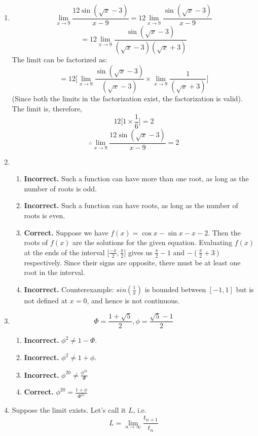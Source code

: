 \documentclass[a4paper,12pt]{article} %
\begin{document}
\begin{enumerate}
  \item \[\lim_{x\to 9} \frac{12 \sin(\sqrt{x} - 3)}{x - 9} = 12 \lim_{x\to 9} \frac{\sin(\sqrt{x} - 3)}{x - 9} \]
    $$ = 12 \lim_{x\to 9} \frac{\sin(\sqrt{x} - 3)}{(\sqrt{x} - 3)(\sqrt{x} + 3)}$$
    The limit can be factorized as:
    $$ = 12 \Big[\lim_{x\to 9} \frac{\sin(\sqrt{x} - 3)}{(\sqrt{x} - 3)} \times \lim_{x\to 9} \frac{1}{(\sqrt{x} + 3)} \Big]$$
    (Since both the limits in the factorization exist, the factorization is valid). The limit is, therefore,
    $$ 12 \Big[1 \times \frac{1}{6}\Big] = 2$$
    $$ \therefore \lim_{x\to 9} \frac{12 \sin(\sqrt{x} - 3)}{x - 9} = 2$$
  \item
    \begin{enumerate}
      \item \textbf{Incorrect.} Such a function can have more than one root, as long as the number of roots is odd.
      \item \textbf{Incorrect.} Such a function can have roots, as long as the number of roots is even.
      \item \textbf{Correct.} Suppose we have $f(x) = \cos{x} - \sin{x} - x - 2$. Then the roots of $f(x)$ are the solutions for the given equation. Evaluating $f(x)$ at the ends of the interval $\Big[\frac{-\pi}{2}, \frac{\pi}{2}\Big]$ gives us $\frac{\pi}{2} - 1$ and $-(\frac{\pi}{2} + 3)$ respectively. Since their signs are opposite, there must be at least one root in the interval.
      \item \textbf{Incorrect.} Counterexample: $sin(\frac{1}{x})$ is bounded between $[-1, 1]$ but is not defined at $x = 0$, and hence is not continuous.
    \end{enumerate}
  \item \[ \Phi = \frac{1 + \sqrt{5}}{2}, \phi = \frac{\sqrt{5} - 1}{2} \]
    \begin{enumerate}
      \item \textbf{Incorrect.} $\phi^2 \neq 1 - \Phi$.
      \item \textbf{Incorrect.} $\phi^2 \neq 1 + \phi$.
      \item \textbf{Incorrect.} $\phi^{20} \neq \frac{\phi^{21}}{\Phi}$
      \item \textbf{Correct.} $\phi^{20} = \frac{1 + \phi}{\Phi^{21}}$
    \end{enumerate}
  \item Suppose the limit exists. Let's call it $L$, i.e.
    $$L = \lim_{n \to \infty}\frac{t_{n+1}}{t_n}$$


\end{enumerate}
\end{document}
